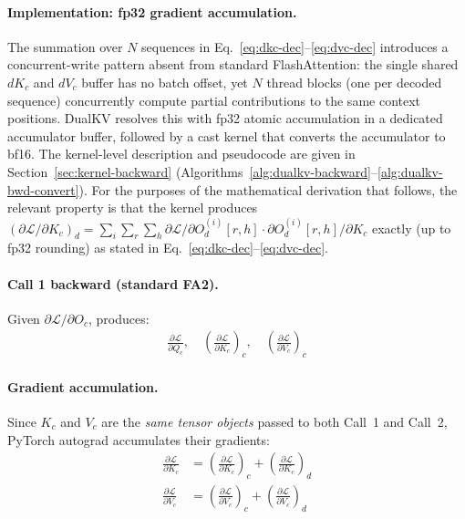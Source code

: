 \documentclass{article}
\begin{document}
\paragraph{Implementation: fp32 gradient accumulation.}
The summation over $N$ sequences in Eq.~\ref{eq:dkc-dec}--\ref{eq:dvc-dec} introduces a concurrent-write pattern absent from standard FlashAttention: the single shared $dK_c$ and $dV_c$ buffer has no batch offset, yet $N$ thread blocks (one per decoded sequence) concurrently compute partial contributions to the same context positions. DualKV resolves this with fp32 atomic accumulation in a dedicated accumulator buffer, followed by a cast kernel that converts the accumulator to bf16. The kernel-level description and pseudocode are given in Section~\ref{sec:kernel-backward} (Algorithms~\ref{alg:dualkv-backward}--\ref{alg:dualkv-bwd-convert}). For the purposes of the mathematical derivation that follows, the relevant property is that the kernel produces $(\partial\mathcal{L}/\partial K_c)_d = \sum_i \sum_r \sum_h \partial\mathcal{L}/\partial O_d^{(i)}[r,h] \cdot \partial O_d^{(i)}[r,h]/\partial K_c$ exactly (up to fp32 rounding) as stated in Eq.~\ref{eq:dkc-dec}--\ref{eq:dvc-dec}.

\paragraph{Call 1 backward (standard FA2).} Given $\partial \mathcal{L}/\partial O_c$, produces:
\begin{align}
  \frac{\partial \mathcal{L}}{\partial Q_c},\quad
  \left(\frac{\partial \mathcal{L}}{\partial K_c}\right)_{\!c},\quad
  \left(\frac{\partial \mathcal{L}}{\partial V_c}\right)_{\!c}
\end{align}

\paragraph{Gradient accumulation.} Since $K_c$ and $V_c$ are the \emph{same tensor objects} passed to both Call~1 and Call~2, PyTorch autograd accumulates their gradients:
\begin{align}
  \frac{\partial \mathcal{L}}{\partial K_c} &= \left(\frac{\partial \mathcal{L}}{\partial K_c}\right)_{\!c} + \left(\frac{\partial \mathcal{L}}{\partial K_c}\right)_{\!d} \label{eq:dkc-total} \\
  \frac{\partial \mathcal{L}}{\partial V_c} &= \left(\frac{\partial \mathcal{L}}{\partial V_c}\right)_{\!c} + \left(\frac{\partial \mathcal{L}}{\partial V_c}\right)_{\!d} \label{eq:dvc-total}
\end{align}
\end{document}
